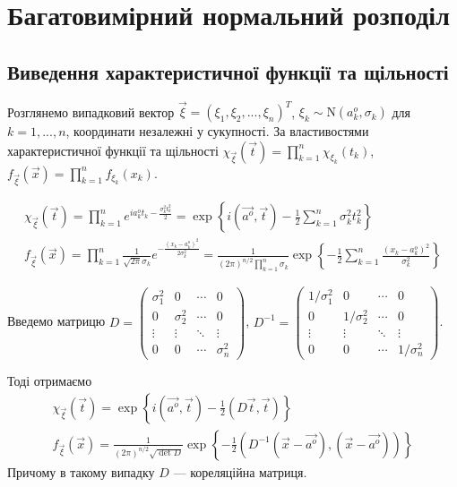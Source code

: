 
\section{Багатовимірний нормальний розподіл}
\subsection{Виведення характеристичної функції та щільності}

Розглянемо випадковий вектор $\vec{\xi} = (\xi_1, \xi_2, ..., \xi_n)^T$, $\xi_k \sim \mathrm{N}(a_k^o, \sigma_k)$ для $k=1,...,n$, координати незалежні у сукупності.
За властивостями характеристичної функції та щільності $\chi_{\vec{\xi}}(\vec{t}) = \prod\limits_{k=1}^n \chi_{\xi_k}(t_k)$,
$f_{\vec{\xi}}(\vec{x}) = \prod\limits_{k=1}^n f_{\xi_k}(x_k)$.

\begin{gather*}
    \chi_{\vec{\xi}}(\vec{t}) = \prod\limits_{k=1}^n e^{i a_k^o t_k - \frac{\sigma_k^2 t_k^2}{2}} = \exp\left\{i(\vec{a^o}, \vec{t}) - \frac{1}{2}\sum\limits_{k=1}^n \sigma_k^2 t_k^2\right\}
    \\
    f_{\vec{\xi}}(\vec{x}) = \prod\limits_{k=1}^n \frac{1}{\sqrt{2\pi}\sigma_k} e^{-\frac{(x_k-a_k^o)^2}{2\sigma_k^2}} = \frac{1}{(2\pi)^{n/2}\prod_{k=1}^n \sigma_k} \exp \left\{ -\frac{1}{2} \sum_{k=1}^n \frac{(x_k-a_k^o)^2}{\sigma_k^2}\right\}
\end{gather*}

Введемо матрицю $D = \begin{pmatrix}
    \sigma_1^2 & 0 & \cdots & 0 \\
    0 & \sigma_2^2 & \cdots & 0 \\
    \vdots & \vdots & \ddots & \vdots \\
    0 & 0 & \cdots & \sigma_n^2
\end{pmatrix}$, $D^{-1} = \begin{pmatrix}
    1/\sigma_1^2 & 0 & \cdots & 0 \\
    0 & 1/\sigma_2^2 & \cdots & 0 \\
    \vdots & \vdots & \ddots & \vdots \\
    0 & 0 & \cdots & 1/\sigma_n^2
\end{pmatrix}$.

\noindent Тоді отримаємо
\begin{gather}
    \chi_{\vec{\xi}}(\vec{t}) = \exp\left\{i(\vec{a^o}, \vec{t}) - \frac{1}{2}(D\vec{t}, \vec{t})\right\}
    \\
    f_{\vec{\xi}}(\vec{x}) = \frac{1}{(2\pi)^{n/2} \sqrt{{\det{D}}}} \exp \left\{ -\frac{1}{2} \left( D^{-1}(\vec{x} - \vec{a^o}), (\vec{x} - \vec{a^o})\right)\right\}
\end{gather}
Причому в такому випадку $D$ --- кореляційна матриця.

